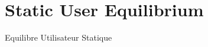

\newpage




\section{Static User Equilibrium}{Equilibre Utilisateur Statique}


\label{sec:transportationequilibrium}





